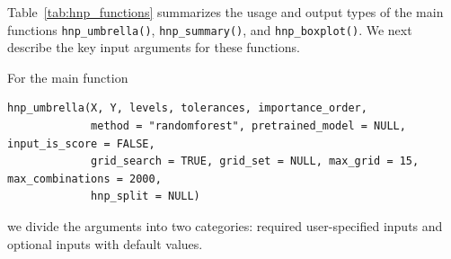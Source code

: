 \begin{table}[h]
\centering
{}
\caption{Core functions in the \href{https://cran.r-project.org/web/packages/HNPclassifier/index.html}{} package and their output types.}
\label{tab:hnp_functions}
\end{table}

Table~\ref{tab:hnp_functions} summarizes the usage and output types of the main functions \texttt{hnp\_umbrella()}, \texttt{hnp\_summary()}, and \texttt{hnp\_boxplot()}. We next describe the key input arguments for these functions.

\medskip

\noindent For the main function
\begin{verbatim}
hnp_umbrella(X, Y, levels, tolerances, importance_order,
             method = "randomforest", pretrained_model = NULL, input_is_score = FALSE, 
             grid_search = TRUE, grid_set = NULL, max_grid = 15, max_combinations = 2000, 
             hnp_split = NULL)
\end{verbatim}
we divide the arguments into two categories: required user-specified inputs and optional inputs with default values.





